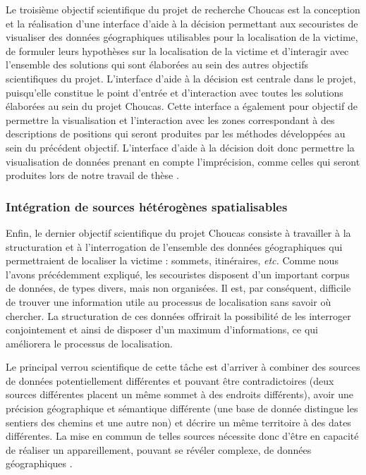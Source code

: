 Le troisième objectif scientifique du projet de recherche Choucas est
la conception et la réalisation d'une interface d'aide à la décision
permettant aux secouristes de visualiser des données géographiques
utilisables pour la localisation de la victime, de formuler leurs
hypothèses sur la localisation de la victime et d’interagir avec
l'ensemble des solutions qui sont élaborées au sein des autres
objectifs scientifiques du projet. L'interface d'aide à la décision
est centrale dans le projet, puisqu'elle constitue le point d'entrée
et d'interaction avec toutes les solutions élaborées au sein du projet
Choucas. Cette interface a également pour objectif de permettre la
visualisation et l'interaction avec les zones correspondant à des
descriptions de positions qui seront produites par les méthodes
développées au sein du précédent objectif. L'interface d'aide à la
décision doit donc permettre la visualisation de données prenant en
compte l'imprécision, comme celles qui seront produites lors de notre
travail de thèse \autocite{Viry2019a}.

\subsubsection{Intégration de sources hétérogènes spatialisables}
\label{subsec:1-2-3-4}

Enfin, le dernier objectif scientifique du projet Choucas consiste à
travailler à la structuration et à l'interrogation de l'ensemble des
données géographiques qui permettraient de localiser la victime :
sommets, itinéraires, \emph{etc.} Comme nous l'avons précédemment
expliqué, les secouristes disposent d'un important corpus de données,
de types divers, mais non organisées. Il est, par conséquent,
difficile de trouver une information utile au processus de
localisation sans savoir où chercher. La structuration de ces données
offrirait la possibilité de les interroger conjointement et ainsi de
disposer d'un maximum d'informations, ce qui améliorera le processus
de localisation.

Le principal verrou scientifique de cette tâche est d'arriver à
combiner des sources de données potentiellement différentes et pouvant
être contradictoires (\eg deux sources différentes placent un même
sommet à des endroits différents), avoir une précision géographique et
sémantique différente (\eg une base de donnée distingue les sentiers
des chemins et une autre non) et décrire un même territoire à des
dates différentes. La mise en commun de telles sources nécessite donc
d'être en capacité de réaliser un appareillement, pouvant se révéler
complexe, de données géographiques
\autocite{VanDamme2019,Halilali2018}.

